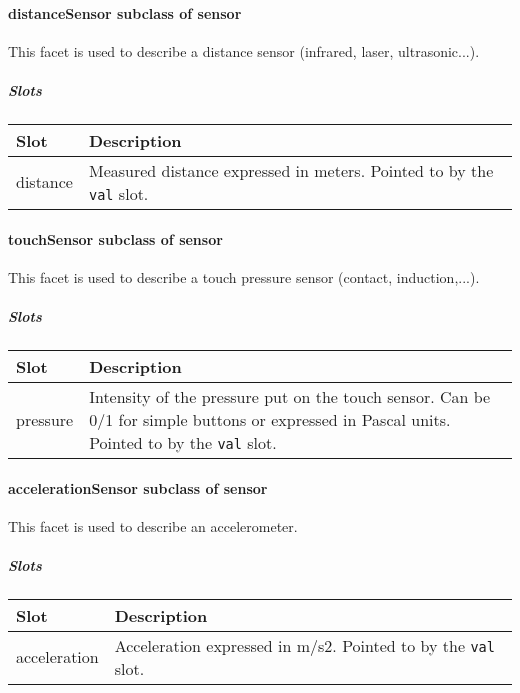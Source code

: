 \documentclass[a4paper]{article}
\begin{document}
\paragraph{ distanceSensor  \textmd{subclass of sensor}}


This facet is used to describe a distance sensor (infrared, laser,
ultrasonic...).

\subparagraph{Slots}

\begin{flushleft}
\tablehead{}
\begin{supertabular}{|m{2.8669999cm}|m{12.422cm}|}
\hline
\sffamily\bfseries Slot &
\sffamily\bfseries Description\\\hline
distance &
\sffamily Measured distance expressed in meters.
Pointed to by the \texttt{val} slot.\\\hline
\end{supertabular}
\end{flushleft}
\paragraph{ touchSensor  \textmd{subclass of sensor}}


This facet is used to describe a touch pressure sensor (contact,
induction,...).

\subparagraph{Slots}

\begin{flushleft}
\tablehead{}
\begin{supertabular}{|m{2.8669999cm}|m{12.422cm}|}
\hline
\sffamily\bfseries Slot &
\sffamily\bfseries Description\\\hline
pressure &
\sffamily Intensity of the pressure put on the
touch sensor. Can be 0/1 for simple buttons or expressed in Pascal
units. Pointed to by the \texttt{val} slot.\\\hline
\end{supertabular}
\end{flushleft}
\paragraph{ accelerationSensor  \textmd{subclass of sensor}}


This facet is used to describe an accelerometer.

\subparagraph{Slots}

\begin{flushleft}
\tablehead{}
\begin{supertabular}{|m{3.651cm}|m{11.639cm}|}
\hline
\sffamily\bfseries Slot &
\sffamily\bfseries Description\\\hline
acceleration &
\sffamily Acceleration expressed in m/s2.
Pointed to by the \texttt{val} slot.\\\hline
\end{supertabular}
\end{flushleft}
\end{document}
